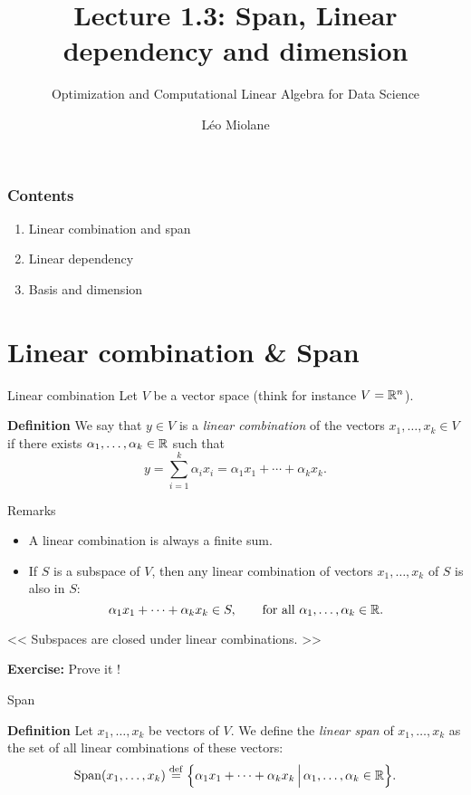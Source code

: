 \documentclass{beamer}
\title{Lecture 1.3: Span, Linear dependency and dimension}
\subtitle{Optimization and Computational Linear Algebra for Data Science}
\author{Léo Miolane}
\date{}
\begin{document}
\setcounter{showProgressBar}{0}
\setcounter{showSlideNumbers}{0}

\frame{\titlepage}

\begin{frame}
	\frametitle{Contents}
	\begin{enumerate}
		\item Linear combination and span
		\item Linear dependency
		\item Basis and dimension
	\end{enumerate}
\end{frame}


\setcounter{framenumber}{0}
\setcounter{showSlideNumbers}{1}

\section{Linear combination \& Span}

\begin{frame}[t]{Linear combination}
	Let $V$ be a vector space (think for instance $V=\mathbb{R}^n$).
	\begin{block}{\bf Definition}
		We say that $y \in V$ is a \emph{linear combination} of the vectors $x_1, \dots, x_k \in V$ if there exists $\alpha_1, \dots, \alpha_k \in \mathbb{R}$ such that
		$$
		y = \sum_{i=1}^k \alpha_i x_i = \alpha_1 x_1 + \cdots + \alpha_k x_k.
		$$
	\end{block}
\end{frame}


\begin{frame}[t]{Remarks}
	\begin{itemize}
		\item A linear combination is always a finite sum.
		\item If $S$ is a subspace of $V$, then any linear combination of vectors $x_1, \dots, x_k$ of $S$ is also in $S$:
			$$
			\alpha_1 x_1 + \cdots + \alpha_k x_k \in S, \qquad \text{for all  } \alpha_1, \dots, \alpha_k \in \mathbb{R}.
			$$
	\end{itemize}
			\vspace{0.2cm}
			\begin{center}
				<< Subspaces are closed under linear combinations. >>
			\end{center}

			\vspace{1cm}
			\textbf{Exercise:} Prove it !
\end{frame}


\begin{frame}[t]{Span}
	\begin{block}{\bf Definition}
		Let $x_1, \dots, x_k$ be vectors of $V$. We define the \emph{linear span} of $x_1, \dots, x_k$ as the set of all linear combinations of these vectors:
		$$
		{{\rm Span}}(x_1, \dots, x_k) \overset{\rm def}{=}
		\Big\{ \alpha_1 x_1 + \cdots + \alpha_k x_k \, \Big| \, \alpha_1, \dots, \alpha_k \in \mathbb{R} \Big\}.
		$$
	\end{block}
\end{frame}
\end{document}
